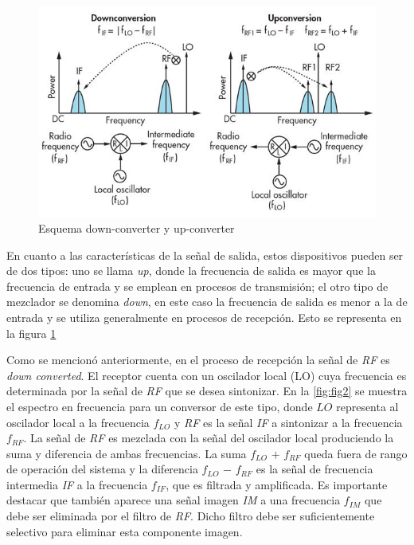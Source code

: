 \documentclass[twocolumn]{article}
\begin{document}
\begin{figure}[!ht]
  \centering    
	\includegraphics[scale=0.4]{imagenes/fig1.jpg}
	\caption{Esquema down-converter y up-converter}\label{fig:fig1}
\end{figure}

En cuanto a las características de la señal de salida, estos dispositivos pueden ser de dos tipos: uno se llama \textit{up}, donde la frecuencia de salida es mayor que la frecuencia de entrada y se emplean en procesos de transmisión; el otro tipo de mezclador se denomina \textit{down}, en este caso la frecuencia de salida es menor a la de entrada y se utiliza generalmente en procesos de recepción. Esto se representa en la figura \textcolor{blue}{\ref{fig:fig1}}

Como se mencionó anteriormente, en el proceso de recepción la señal de \textit{RF} es \textit{down converted}. El receptor cuenta con un oscilador local (LO) cuya frecuencia es determinada por la señal de \textit{RF} que se desea sintonizar. En la \textcolor{blue}{\ref{fig:fig2}} se muestra el espectro en frecuencia para un conversor de este tipo, donde $LO$ representa al oscilador local a la frecuencia $f_{LO}$ y \textit{RF} es la señal \textit{IF} a sintonizar a la frecuencia $f_{RF}$. La señal de \textit{RF} es mezclada con la señal del oscilador local produciendo la suma y diferencia de ambas frecuencias. La suma $f_{LO}$ $+$ $f_{RF}$ queda fuera de rango de operación del sistema y la diferencia $f_{LO}$ $-$ $f_{RF}$ es la señal de frecuencia intermedia \textit{IF} a la frecuencia $f_{IF}$, que es filtrada y amplificada. Es importante destacar que también aparece una señal imagen \textit{IM} a una frecuencia $f_{IM}$ que debe ser eliminada por el filtro de \textit{RF}. Dicho filtro debe ser suficientemente selectivo para eliminar esta componente imagen.
\end{document}
